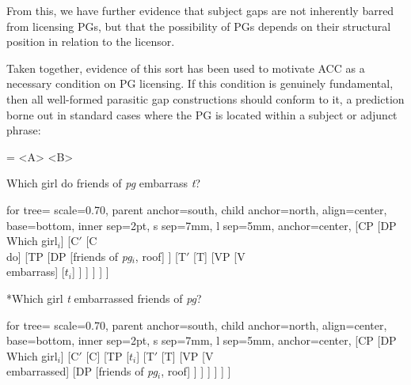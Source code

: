 \documentclass[12pt]{article}
\newcommand{\TwoTreeCols}[2]{%
  \noindent\parbox[t]{0.47\linewidth}{#1}%
  \hspace{1.2em}%
  \parbox[t]{0.47\linewidth}{#2}\par
}
\begin{document}
\vspace{\baselineskip}

\noindent From this, we have further evidence that subject gaps are not inherently barred from licensing PGs, but that the possibility of PGs depends on their structural position in relation to the licensor.

Taken together, evidence of this sort has been used to motivate ACC as a necessary condition on PG licensing. If this condition is genuinely fundamental, then all well-formed parasitic gap constructions should conform to it, a prediction borne out in standard cases where the PG is located within a subject or adjunct phrase:

\vspace{\baselineskip}


=\vbox{%
  \a<A>\relax
  \a<B>\relax
}

\TwoTreeCols
{%
   Which girl do friends of \textit{pg} embarrass \textit{t}?%

  \vspace{0.6\baselineskip}
  \centering
  \begin{forest}
  for tree={
    scale=0.70,
    parent anchor=south,
    child anchor=north,
    align=center,
    base=bottom,
    inner sep=2pt,
    s sep=7mm,
    l sep=5mm,
    anchor=center,
  }
  [CP
    [DP\\Which girl$_i$]
    [C$'$
      [C\\do]
      [TP
        [DP
          [{friends of \textit{pg}$_i$}, roof]
        ]
        [T$'$
          [T]
          [VP
            [V\\embarrass]
            [$t_i$]
          ]
        ]
      ]
    ]
  ]
  \end{forest}
}
{%
  \getref{ex4.B} *Which girl \textit{t} embarrassed friends of \textit{pg}?%

  \vspace{0.6\baselineskip}
  \centering
  \begin{forest}
  for tree={
    scale=0.70,
    parent anchor=south,
    child anchor=north,
    align=center,
    base=bottom,
    inner sep=2pt,
    s sep=7mm,
    l sep=5mm,
    anchor=center,
  }
  [CP
    [DP\\Which girl$_i$]
    [C$'$
      [C]
      [TP
        [$t_i$]
        [T$'$
          [T]
          [VP
            [V\\embarrassed]
            [DP
              [{friends of \textit{pg}$_i$}, roof]
            ]
          ]
        ]
      ]
    ]
  ]
  \end{forest}
}
\end{document}
